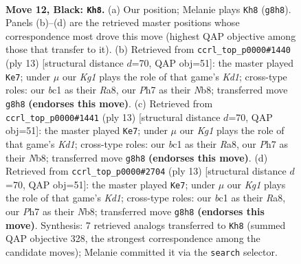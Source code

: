 \documentclass[11pt]{article}
\begin{document}
\clearpage

\begin{figure}[p]\centering
\begin{subfigure}{0.46\textwidth}\centering
\resizebox{\linewidth}{!}{%
\newchessgame
\chessboard[
  setfen={rn1r2k1/ppp2pbp/4bnp1/2P1p3/PP2P2P/2N2N2/4BPP1/R1B1K2R b KQ - 0 12},
  showmover=false,
  pgfstyle=straightmove, color=movearrow, markmove={g8-h8}
]}
\caption{}
\end{subfigure}\hfill
\begin{subfigure}{0.46\textwidth}\centering
\resizebox{\linewidth}{!}{%
\newchessgame
\chessboard[
  setfen={rnbk3r/ppp2ppp/3b1n2/4p3/2B1P3/2N2N2/PPP2PPP/R1B1K2R b KQ - 3 7},
  showmover=false,
  pgfstyle=straightmove, color=movearrow, markmove={d8-e7}
]}
\caption{}
\end{subfigure}
\\[4pt]
\begin{subfigure}{0.46\textwidth}\centering
\resizebox{\linewidth}{!}{%
\newchessgame
\chessboard[
  setfen={rnbk3r/ppp2ppp/3b1n2/4p3/2B1P3/2N2N2/PPP2PPP/R1B1K2R b KQ - 3 7},
  showmover=false,
  pgfstyle=straightmove, color=movearrow, markmove={d8-e7}
]}
\caption{}
\end{subfigure}\hfill
\begin{subfigure}{0.46\textwidth}\centering
\resizebox{\linewidth}{!}{%
\newchessgame
\chessboard[
  setfen={rnbk3r/ppp2ppp/3b1n2/4p3/2B1P3/2N2N2/PPP2PPP/R1B1K2R b KQ - 3 7},
  showmover=false,
  pgfstyle=straightmove, color=movearrow, markmove={d8-e7}
]}
\caption{}
\end{subfigure}
\caption{\textbf{Move 12, Black: \texttt{Kh8}.} (a) Our position; Melanie plays \texttt{Kh8} (\texttt{g8h8}). Panels (b)--(d) are the retrieved master positions whose correspondence most drove this move (highest QAP objective among those that transfer to it). (b) Retrieved from \texttt{ccrl\_top\_p0000\#1440} (ply 13) [structural distance $d$=70, QAP obj=51]: the master played \texttt{Ke7}; under $\mu$ our \emph{Kg1} plays the role of that game's \emph{Kd1}; cross-type roles: our \emph{b}c1 as their \emph{R}a8, our \emph{P}h7 as their \emph{N}b8; transferred move \texttt{g8h8} \textbf{(endorses this move)}. (c) Retrieved from \texttt{ccrl\_top\_p0000\#1441} (ply 13) [structural distance $d$=70, QAP obj=51]: the master played \texttt{Ke7}; under $\mu$ our \emph{Kg1} plays the role of that game's \emph{Kd1}; cross-type roles: our \emph{b}c1 as their \emph{R}a8, our \emph{P}h7 as their \emph{N}b8; transferred move \texttt{g8h8} \textbf{(endorses this move)}. (d) Retrieved from \texttt{ccrl\_top\_p0000\#2704} (ply 13) [structural distance $d$=70, QAP obj=51]: the master played \texttt{Ke7}; under $\mu$ our \emph{Kg1} plays the role of that game's \emph{Kd1}; cross-type roles: our \emph{b}c1 as their \emph{R}a8, our \emph{P}h7 as their \emph{N}b8; transferred move \texttt{g8h8} \textbf{(endorses this move)}. Synthesis: 7 retrieved analogs transferred to \texttt{Kh8} (summed QAP objective 328, the strongest correspondence among the candidate moves); Melanie committed it via the \texttt{search} selector.}
\label{fig:thought-m23}
\end{figure}
\end{document}

